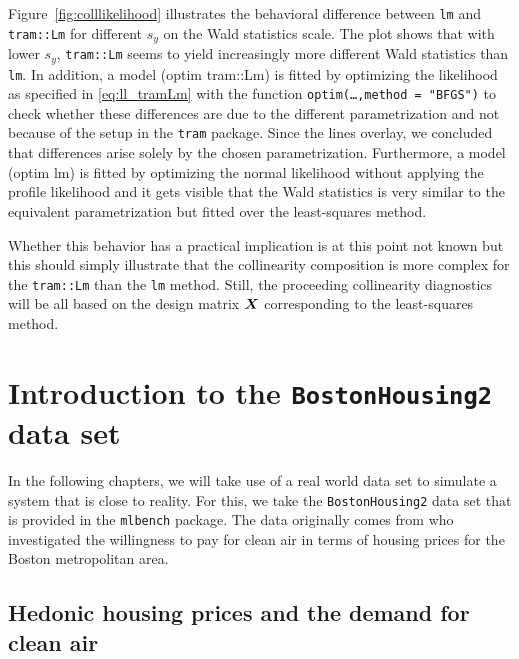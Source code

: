 \documentclass[11pt,a4paper,twoside]{book}\usepackage[]{graphicx}\usepackage[]{xcolor}
\begin{document}
Figure~\ref{fig:colllikelihood} illustrates the behavioral difference between \texttt{lm} and \texttt{tram::Lm} for different $s_y$ on the Wald statistics scale. The plot shows that with lower $s_y$, \texttt{tram::Lm} seems to yield increasingly more different Wald statistics than \texttt{lm}. In addition, a model (optim tram::Lm) is fitted by optimizing the likelihood as specified in \eqref{eq:ll_tramLm} with the function \texttt{optim(\dots,method = "BFGS")} to check whether these differences are due to the different parametrization and not because of the setup in the \texttt{tram} package. Since the lines overlay, we concluded that differences arise solely by the chosen parametrization. Furthermore, a model (optim lm) is fitted by optimizing the normal likelihood without applying the profile likelihood and it gets visible that the Wald statistics is very similar to the equivalent parametrization but fitted over the least-squares method.

Whether this behavior has a practical implication is at this point not known but this should simply illustrate that the collinearity composition is more complex for the \texttt{tram::Lm} than the \texttt{lm} method. Still, the proceeding collinearity diagnostics will be all based on the design matrix ${\boldsymbol{X}}$ corresponding to the least-squares method.














\chapter{Introduction to the \texttt{BostonHousing2} data set}\label{chap:boston_intro}

In the following chapters, we will take use of a real world data set to simulate a system that is close to reality. For this, we take the \texttt{BostonHousing2} data set that is provided in the \texttt{mlbench} package. The data originally comes from \cite{Harrison1978} who investigated the willingness to pay for clean air in terms of housing prices for the Boston metropolitan area.

\section{Hedonic housing prices and the demand for clean air}
\end{document}
